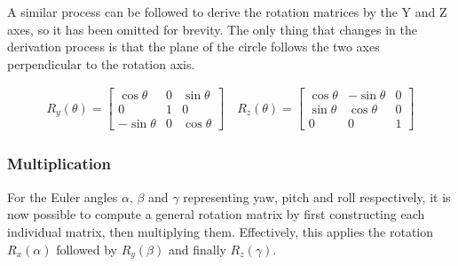 \documentclass[12pt, a4paper]{article}
\begin{document}
A  similar process can be followed to derive the rotation matrices by the Y and
Z axes, so it has been omitted for brevity. The only thing that changes in the
derivation process is that the plane of the circle follows the two axes perpendicular to
the rotation axis.

\begin{align*}
    R_y(\theta) = \begin{bmatrix}
                      \cos \theta  & 0 & \sin \theta \\
                      0            & 1 & 0           \\
                      -\sin \theta & 0 & \cos \theta
                  \end{bmatrix}
    \quad
    R_z(\theta) = \begin{bmatrix}
                      \cos \theta & -\sin \theta & 0 \\
                      \sin \theta & \cos \theta  & 0 \\
                      0           & 0            & 1
                  \end{bmatrix}
\end{align*}

\subsubsection{Multiplication}

For the Euler angles $\alpha$, $\beta$ and $\gamma$ representing yaw, pitch and
roll respectively, it is now possible to compute a general rotation matrix by
first constructing each individual matrix, then multiplying them. Effectively,
this applies the rotation $R_x(\alpha)$ followed by $R_y(\beta)$ and finally
$R_z(\gamma)$.
\end{document}

